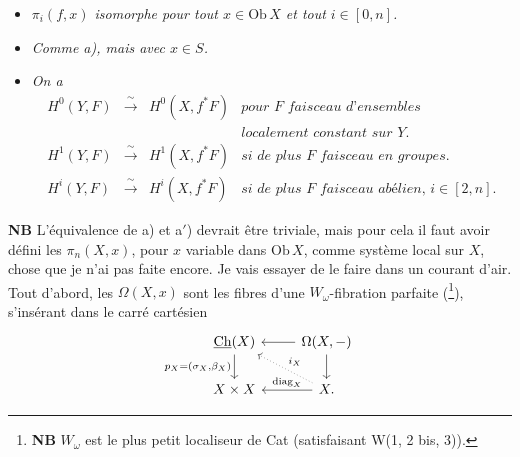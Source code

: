 \documentclass[11pt]{article}
\newcommand{\printedpage}[1]{\marginpar{\footnotesize p.~#1}}
\newcommand{\msp}[1]{\marginpar{\footnotesize [#1]}}
\newcommand{\Ch}{\underline{\mathrm{Ch}}}
\newcommand{\Ob}{\mathrm{Ob}\,}
\begin{document}
\begin{itemize}
\item[\textit{a)}] \textit{$\pi_i(f,x)$ isomorphe pour tout $x \in \Ob X$ et tout $i \in [0,n]$.}

\item[\textit{a$'$)}] \textit{Comme a), mais avec $x \in S$.}

\item[\textit{b)}] \textit{On a}
\[
\begin{array}{rcll}
H^0(Y,F) & \xrightarrow{\ \sim\ } & H^0(X,f^*F) & \textit{pour $F$ faisceau d'ensembles}\\
 & & & \textit{localement constant sur $Y$.}\\
H^1(Y,F) & \xrightarrow{\ \sim\ } & H^1(X,f^*F) & \textit{si de plus $F$ faisceau en groupes.}\\
H^i(Y,F) & \xrightarrow{\ \sim\ } & H^i(X,f^*F) & \textit{si de plus $F$ faisceau abélien, $i \in [2,n]$.}
\end{array}
\]
\end{itemize}

\msp{page 173}

\textbf{NB} L'équivalence de a) et a$'$) devrait être triviale, mais pour cela il faut avoir défini les $\pi_n(X,x)$, pour $x$ variable dans $\Ob X$, comme système local sur $X$, chose que je n'ai pas faite encore. Je vais essayer de le faire dans un courant d'air. Tout d'abord, les $\Omega(X,x)$ sont les fibres d'une $W_\omega$-fibration parfaite (\footnote[113]{\textbf{NB} $W_\omega$ est le plus petit localiseur de Cat (satisfaisant W(1, 2 bis, 3)).}), s'insérant dans le carré cartésien
\[
\begin{tikzcd}
\Ch(X) \arrow[d, "{p_X=(\sigma_X,\beta_X)}"'] & \Omega(X,-) \arrow[l] \arrow[d] \\
X \times X & X. \arrow[l, "\mathrm{diag}_X"'] \arrow[ul, dotted, "i_X"']
\end{tikzcd}
\]

\clearpage

\printedpage{117}
\end{document}
